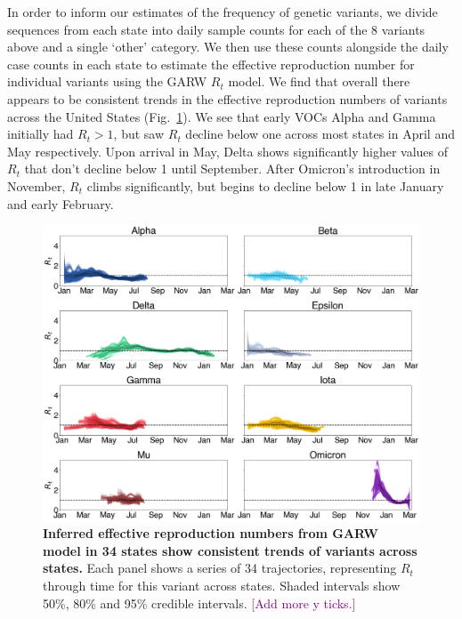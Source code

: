 \documentclass[11pt,oneside,letterpaper]{article}
\def\tbc#1{\textcolor{purple}{[#1]}}
\begin{document}
In order to inform our estimates of the frequency of genetic variants, we divide sequences from each state into daily sample counts for each of the 8 variants above and a single `other' category.
We then use these counts alongside the daily case counts in each state to estimate the effective reproduction number for individual variants using the GARW $R_{t}$ model.
We find that overall there appears to be consistent trends in the effective reproduction numbers of variants across the United States (Fig.\ \ref{fig:rt_consensus}).
We see that early VOCs Alpha and Gamma initially had $R_t>1$, but saw $R_t$ decline below one across most states in April and May respectively.
Upon arrival in May, Delta shows significantly higher values of $R_t$ that don't decline below 1 until September.
After Omicron's introduction in November, $R_{t}$ climbs significantly, but begins to decline below 1 in late January and early February.

\begin{figure}[t]
  \centering
  \includegraphics[width=\linewidth]{figs/rt_consensus.png}
  \caption{\textbf{Inferred effective reproduction numbers from GARW model in 34 states show consistent trends of variants across states.}
  Each panel shows a series of 34 trajectories, representing $R_t$ through time for this variant across states.
  Shaded intervals show 50\%, 80\% and 95\% credible intervals.
  \tbc{Add more y ticks.}
  }
  \label{fig:rt_consensus}
\end{figure}
\end{document}
